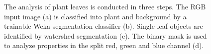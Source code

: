 \documentclass[paper=A4,bibliography=totocnumbered]{scrartcl}
\begin{document}
\begin{figure}
	\centering
	\qquad
	\qquad
	\qquad
	\caption[Image analysis pipeline]{The analysis of plant leaves is conducted in three steps. The RGB input image (a) is classified into plant and background by a trainable Weka segmentation classifier (b). Single leaf objects are identified by watershed segmentation (c). The binary mask is used to analyze properties in the split red, green and blue channel (d).}
	\label{fig:pipeline}
\end{figure}
\end{document}
